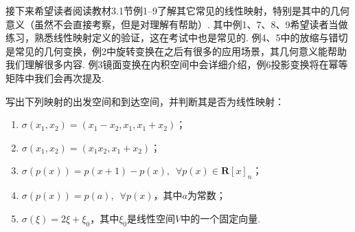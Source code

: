 接下来希望读者阅读教材3.1节例1--9了解其它常见的线性映射，特别是其中的几何意义（虽然不会直接考察，但是对理解有帮助）. 其中例1、7、8、9希望读者当做练习，熟悉线性映射定义的验证，这在考试中也是常见的. 例4、5中的放缩与错切是常见的几何变换，例2中旋转变换在之后有很多的应用场景，其几何意义能帮助我们理解很多内容. 例3镜面变换在内积空间中会详细介绍，例6投影变换将在幂等矩阵中我们会再次提及.
\begin{example}
    写出下列映射的出发空间和到达空间，并判断其是否为线性映射：
    \begin{enumerate}
        \item $\sigma(x_1,x_2)=(x_1-x_2,x_1,x_1+x_2)$；

        \item $\sigma(x_1,x_2)=(x_1x_2,x_1+x_2)$；

        \item $\sigma(p(x))=p(x+1)-p(x),\enspace\forall p(x) \in \mathbf{R}[x]_n$；

        \item $\sigma(p(x))=p(a),\enspace\forall p(x)$，其中$a$为常数；

        \item $\sigma(\xi)=2\xi+\xi_0$，其中$\xi_0$是线性空间$V$中的一个固定向量.
    \end{enumerate}
\end{example}

